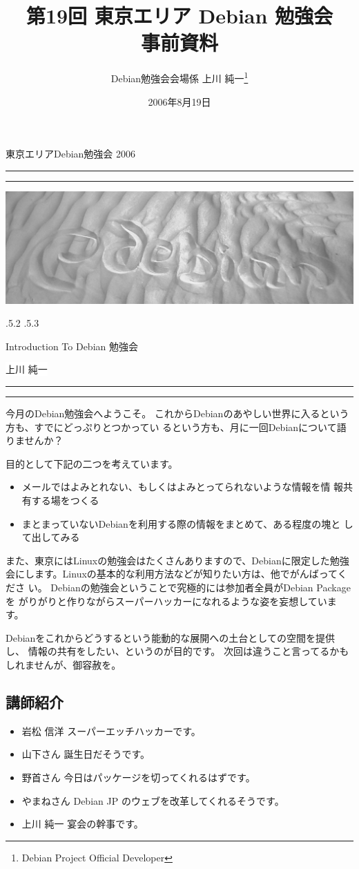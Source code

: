 \documentclass[mingoth,a4paper]{jsarticle}
\makeatletter
\renewcommand{\section}{\@startsection{section}{1}{\z@}%
    {\Cvs \@plus.5\Cdp \@minus.2\Cdp}%
    {.5\Cvs \@plus.3\Cdp}%
    {\normalfont\Huge\headfont\raggedright\centering}} %
\newcommand{\dancersection}[2]{%
\newpage
東京エリアDebian勉強会 2006
\hrule
\vspace{0.5mm}
\hrule
\includegraphics[width=16cm]{image2006-natsu/guruguru-sand-light.png}\\
\vspace{-5cm}
\begin{center}
\section{#1}
\end{center}
\hfill{}\colorbox{white}{#2}\hspace{3cm}\space\\
\vspace{1cm}
\hrule
\vspace{0.5mm}
\hrule
\vspace{1cm}
}
\makeatother
\begin{document}
\begin{titlepage}

\title{
 第19回 東京エリア Debian 勉強会\\事前資料}
\date{2006年8月19日}
\author{Debian勉強会会場係 上川 純一\thanks{Debian Project Official Developer}} 
\maketitle
\thispagestyle{empty}
\end{titlepage}

\newpage
\tableofcontents

\dancersection{Introduction To Debian 勉強会}{上川 純一}

今月のDebian勉強会へようこそ。
これからDebianのあやしい世界に入るという方も、すでにどっぷりとつかってい
るという方も、月に一回Debianについて語りませんか？

目的として下記の二つを考えています。

\begin{itemize}
 \item メールではよみとれない、もしくはよみとってられないような情報を情
       報共有する場をつくる
 \item まとまっていないDebianを利用する際の情報をまとめて、ある程度の塊と
       して出してみる
\end{itemize}

また、東京にはLinuxの勉強会はたくさんありますので、Debianに限定した勉強
会にします。Linuxの基本的な利用方法などが知りたい方は、他でがんばってくださ
い。
Debianの勉強会ということで究極的には参加者全員がDebian Packageを
がりがりと作りながらスーパーハッカーになれるような姿を妄想しています。

Debianをこれからどうするという能動的な展開への土台としての空間を提供し、
情報の共有をしたい、というのが目的です。
次回は違うこと言ってるかもしれませんが、御容赦を。

\subsection{講師紹介}

\begin{itemize}
 \item{岩松 信洋} スーパーエッチハッカーです。
 \item{山下さん} 誕生日だそうです。
 \item{野首さん} 今日はパッケージを切ってくれるはずです。
 \item{やまねさん} Debian JP のウェブを改革してくれるそうです。
 \item{上川 純一} 宴会の幹事です。
\end{itemize}
\end{document}
